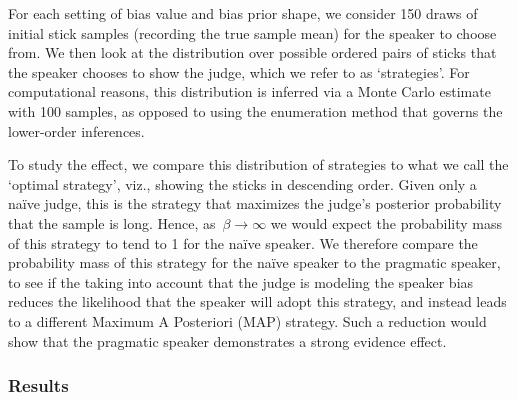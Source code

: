 \documentclass[10pt,letterpaper]{article}
\begin{document}
For each setting of bias value and bias prior shape, we consider 150 draws of initial stick samples (recording the true sample mean)
for the speaker to choose from.
We then look at the distribution over possible ordered pairs of sticks that the speaker chooses to show the judge, 
which we refer to as `strategies'. For computational reasons, this distribution is inferred via a Monte Carlo estimate with 100 samples,
as opposed to using the enumeration method that governs the lower-order inferences.

To study the effect, we compare this distribution of strategies to what we call the `optimal strategy', viz., showing the sticks in descending order.
Given only a na\"ive judge, this is the strategy that maximizes the judge's posterior probability that the sample is long. Hence, as~${\beta\to\infty}$ 
we would expect the probability mass of this strategy to tend to 1 for the na\"ive speaker. We therefore compare the probability mass of this 
strategy for the na\"ive speaker to the pragmatic speaker, to see if the taking into account that the judge is modeling the speaker bias reduces the 
likelihood that the speaker will adopt this strategy, and instead leads to a different Maximum A Posteriori (MAP) strategy. Such
a reduction would show that the pragmatic speaker demonstrates a strong evidence effect.

\subsubsection{Results}
\begin{table}[h]
\begin{center} 
\caption{Percentage of trials for which the MAP strategy is the optimal strategy, given for both speakers $S_1$ and $S_2$.} 
\label{seeSpeakerTable} 
\vskip 0.12in
\end{center} 
\end{table}
\end{document}
